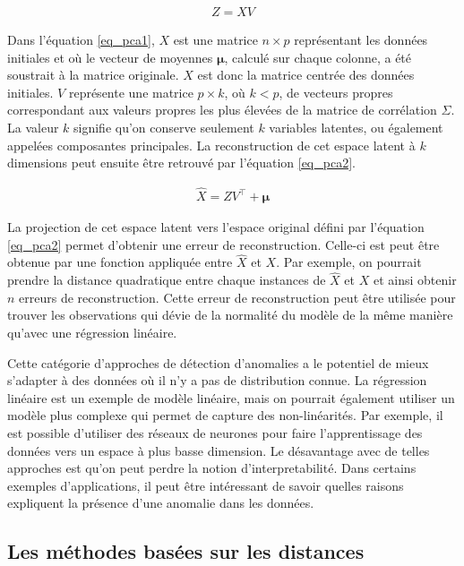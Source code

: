 \begin{gather}  \label{eq_pca1}
 Z = XV
 \end{gather}
 
Dans l'équation \ref{eq_pca1}, $X$ est une matrice $n \times p$ représentant les données initiales et où le vecteur de moyennes $\boldsymbol{\mu}$, calculé sur chaque colonne, a été soustrait à la matrice originale. $X$ est donc la matrice centrée des données initiales. $V$ représente une matrice $p \times k$, où $k < p$, de  vecteurs propres correspondant aux valeurs propres les plus élevées de la matrice de corrélation $\Sigma$. La valeur $k$ signifie qu'on conserve seulement $k$ variables latentes, ou également appelées composantes principales. La reconstruction de cet espace latent à $k$ dimensions peut ensuite être retrouvé par l'équation \ref{eq_pca2}. 
 
  \begin{gather}  \label{eq_pca2}
 \hat{X} = ZV^\top + \boldsymbol{\mu}
 \end{gather}
 
La projection de cet espace latent vers l'espace original défini par l'équation \ref{eq_pca2} permet d'obtenir une erreur de reconstruction. Celle-ci est peut être obtenue par une fonction appliquée entre $\hat{X}$ et $X$. Par exemple, on pourrait prendre la distance quadratique entre chaque instances de $\hat{X}$ et $X$ et ainsi obtenir $n$ erreurs de reconstruction. Cette erreur de reconstruction peut être utilisée pour trouver les observations qui dévie de la normalité du modèle de la même manière qu'avec une régression linéaire.
  
Cette catégorie d'approches de détection d'anomalies a le potentiel de mieux s'adapter à des données où il n'y a pas de distribution connue. La régression linéaire est un exemple de modèle linéaire, mais on pourrait également utiliser un modèle plus complexe qui permet de capture des non-linéarités. Par exemple, il est possible d'utiliser des réseaux de neurones pour faire l'apprentissage des données vers un espace à plus basse dimension. Le désavantage avec de telles approches est qu'on peut perdre la notion d'interpretabilité. Dans certains exemples d'applications, il peut être intéressant de savoir quelles raisons expliquent la présence d'une anomalie dans les données.

\subsection{Les méthodes basées sur les distances}

